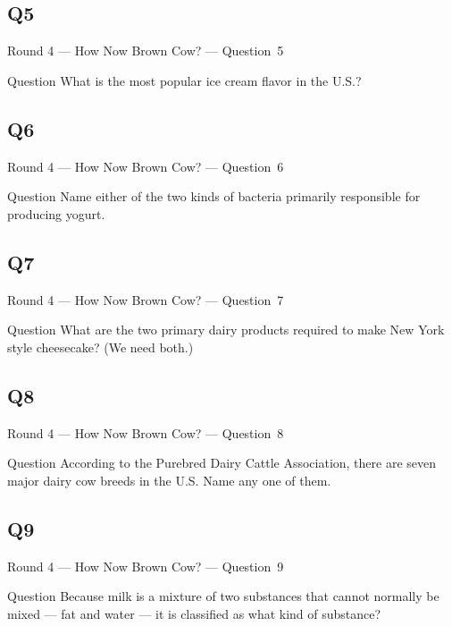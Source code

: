 \documentclass[11pt]{beamer}
\begin{document}
\subsection*{Q5}
\begin{frame}[t]{Round 4 --- How Now Brown Cow? --- \mbox{Question 5}}
\vspace{-0.5em}
\begin{block}{Question}
What is the most popular ice cream flavor in the U.S.?
\end{block}
\end{frame}
\subsection*{Q6}
\begin{frame}[t]{Round 4 --- How Now Brown Cow? --- \mbox{Question 6}}
\vspace{-0.5em}
\begin{block}{Question}
Name either of the two kinds of bacteria primarily responsible for producing yogurt.
\end{block}
\end{frame}
\subsection*{Q7}
\begin{frame}[t]{Round 4 --- How Now Brown Cow? --- \mbox{Question 7}}
\vspace{-0.5em}
\begin{block}{Question}
What are the two primary dairy products required to make New York style cheesecake? (We need both.)
\end{block}
\end{frame}
\subsection*{Q8}
\begin{frame}[t]{Round 4 --- How Now Brown Cow? --- \mbox{Question 8}}
\vspace{-0.5em}
\begin{block}{Question}
According to the Purebred Dairy Cattle Association, there are seven major dairy cow breeds in the U.S\@. Name any one of them.
\end{block}
\end{frame}
\subsection*{Q9}
\begin{frame}[t]{Round 4 --- How Now Brown Cow? --- \mbox{Question 9}}
\vspace{-0.5em}
\begin{block}{Question}
Because milk is a mixture of two substances that cannot normally be mixed --- fat and water --- it is classified as what kind of substance?
\end{block}
\end{frame}
\end{document}
